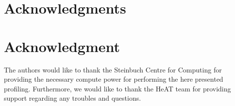 
\ifCLASSOPTIONcompsoc
  \section*{Acknowledgments}
\else
  \section*{Acknowledgment}
\fi
The authors would like to thank the Steinbuch Centre for Computing for providing the necessary compute power for
performing the here presented profiling.
Furthermore, we would like to thank the HeAT team for providing support regarding any troubles and questions.
